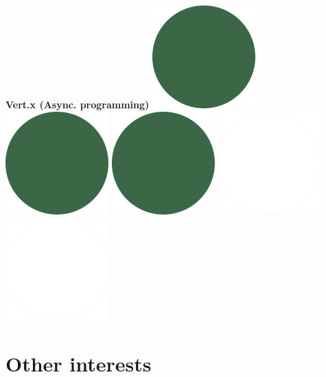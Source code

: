 \documentclass[]{commands}
\begin{document}
\begin{aside}
\textbf{Vert.x (Async. programming)}\hfill
\includegraphics[scale=0.11]{img/IPSGreenDots.png}
\includegraphics[scale=0.11]{img/IPSGreenDots.png}
\includegraphics[scale=0.11]{img/IPSGreenDots.png}
\includegraphics[scale=0.11]{img/WhiteDots.png}
\includegraphics[scale=0.11]{img/WhiteDots.png}

\vspace{3.5mm}
\section{Other interests}
\vspace{3.5mm}


\end{aside}
\end{document}
